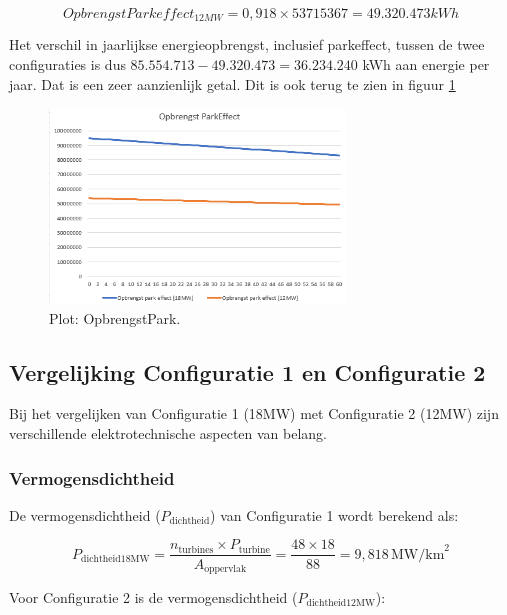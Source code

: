 \begin{equation} \label{eq:17}
OpbrengstParkeffect_{12MW}= 0,918\times 53715367 = 49.320.473 kWh
\end{equation}

Het verschil in jaarlijkse energieopbrengst, inclusief parkeffect, tussen de twee configuraties is dus \(85.554.713 - 49.320.473 = 36.234.240\) kWh aan energie per jaar. Dat is een zeer aanzienlijk getal. Dit is ook terug te zien in figuur \ref{fig:OpbrengstPark}

\begin{figure}[H]
\centering
\includegraphics[width=0.7\textwidth]{IMG/data/overzicht/OpbrengstPark_graph.PNG}
\caption{Plot: OpbrengstPark.}
\label{fig:OpbrengstPark}
\end{figure}

\subsection{Vergelijking Configuratie 1 en Configuratie 2}

Bij het vergelijken van Configuratie 1 (18MW) met Configuratie 2 (12MW) zijn verschillende elektrotechnische aspecten van belang. 

\subsubsection{Vermogensdichtheid}

De vermogensdichtheid (\(P_{\text{dichtheid}}\)) van Configuratie 1 wordt berekend als:

\[
P_{\text{dichtheid18MW}} = \frac{{n_{\text{turbines}} \times P_{\text{turbine}}}}{{A_{\text{oppervlak}}}} = \frac{{48 \times 18}}{{88}} = 9,818 \, \text{MW/km}^2
\]

Voor Configuratie 2 is de vermogensdichtheid (\(P_{\text{dichtheid12MW}}\)):

